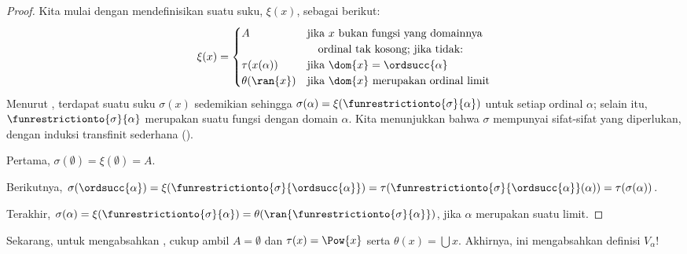\documentclass[../../../include/open-logic-section]{subfiles}
\begin{document}
\begin{proof}
Kita mulai dengan mendefinisikan suatu suku, $\xi(x)$, sebagai berikut:
\[
	\xi(x) =
	\begin{cases}
			A &\text{jika $x$ bukan fungsi yang domainnya}\\
			&\hspace{1em}\text{ordinal tak kosong; jika tidak:}\\
			\tau(x(\alpha)) & \text{jika $\dom{x} = \ordsucc{\alpha}$}\\
			\theta(\ran{x}) & \text{jika $\dom{x}$ merupakan ordinal limit}
	\end{cases}
\]
Menurut , terdapat suatu suku $\sigma(x)$
sedemikian sehingga $\sigma(\alpha) =
\xi(\funrestrictionto{\sigma}{\alpha})$ untuk setiap ordinal $\alpha$;
selain itu, $\funrestrictionto{\sigma}{\alpha}$ merupakan suatu fungsi dengan
domain $\alpha$. Kita menunjukkan bahwa $\sigma$ mempunyai sifat-sifat yang
diperlukan, dengan induksi transfinit sederhana
().

Pertama, $\sigma(\emptyset) = \xi(\emptyset) = A$.

Berikutnya, $\sigma(\ordsucc{\alpha}) =
\xi(\funrestrictionto{\sigma}{\ordsucc{\alpha}}) =
\tau(\funrestrictionto{\sigma}{\ordsucc{\alpha}}(\alpha)) =
\tau(\sigma(\alpha))$.

Terakhir, $\sigma(\alpha) =
\xi(\funrestrictionto{\sigma}{\alpha}) =
\theta(\ran{\funrestrictionto{\sigma}{\alpha}})$, jika $\alpha$ merupakan
suatu limit.
\end{proof}
\noindent
Sekarang, untuk mengabsahkan , cukup ambil $A =
\emptyset$ dan $\tau(x) = \Pow{x}$ serta $\theta(x) = \bigcup x$. Akhirnya,
ini mengabsahkan definisi $V_\alpha$!{}
\end{document}
